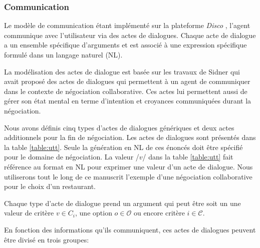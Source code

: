 	\subsubsection{Communication}
		Le modèle de communication étant implémenté sur la plateforme \emph{Disco} \cite{rich09}, l'agent communique avec l'utilisateur via des actes de dialogues. Chaque acte de dialogue a un ensemble spécifique d'arguments et est associé à une expression spécifique formulé dans un langage naturel (NL).
		
		La modélisation des actes de dialogue est basée sur les travaux de Sidner \cite{sidner1994artificial} qui avait proposé des actes de dialogues qui permettent à un agent de communiquer dans le contexte de négociation collaborative. Ces actes lui permettent aussi de gérer son état mental en terme d'intention et croyances communiquées durant la négociation. 
		
		Nous avons définis cinq types d'actes de dialogues génériques et deux actes additionnels pour la fin de négociation. Les actes de dialogues sont présentés dans la table \ref{table:utt}. Seule la génération en NL de ces énoncés doit être spécifié pour le domaine de négociation. La valeur /$v$/ dans la table \ref{table:utt} fait référence au format en NL pour exprimer une valeur d'un acte de dialogue.
		Nous utiliserons tout le long de ce manuscrit l'exemple d'une négociation collaborative pour le choix d'un restaurant. 
		
		Chaque type d'acte de dialogue prend un argument qui peut être soit un une valeur de critère  $v \in C_i$, une option $o \in \mathcal{O}$ ou encore critère $i \in \mathcal{C}$. 
		
		En fonction des informations qu'ils communiquent, ces actes de dialogues peuvent être divisé en trois groupes:
		
